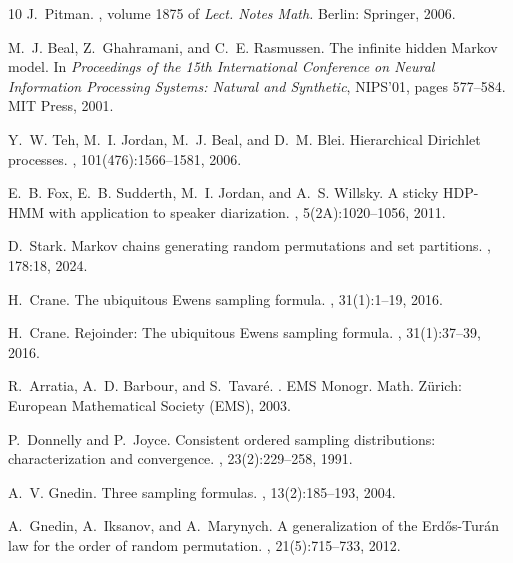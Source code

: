 \documentclass[11pt]{article}
\newcommand{\1}[1][]{
	\ifx&#1&\mathds{1}
	\else\mathds{1}\left\{#1\right\}\fi}
\theoremstyle{definition}
\theoremstyle{remark}
\numberwithin{equation}{section}
\begin{document}
	\begin{thebibliography}{10}
		J.~Pitman.
		, volume 1875 of {\em
			Lect. Notes Math.}
		\newblock Berlin: Springer, 2006.

		M.~J. Beal, Z.~Ghahramani, and C.~E. Rasmussen.
		\newblock The infinite hidden Markov model.
		\newblock In {\em Proceedings of the 15th International Conference on Neural
			Information Processing Systems: Natural and Synthetic}, NIPS'01, pages
		577--584. MIT Press, 2001.

		Y.~W. Teh, M.~I. Jordan, M.~J. Beal, and D.~M. Blei.
		\newblock Hierarchical {Dirichlet} processes.
		, 101(476):1566--1581, 2006.

		E.~B. Fox, E.~B. Sudderth, M.~I. Jordan, and A.~S. Willsky.
		\newblock A sticky {HDP}-{HMM} with application to speaker diarization.
		, 5(2A):1020--1056, 2011.

		D.~Stark.
		\newblock Markov chains generating random permutations and set partitions.
		, 178:18, 2024.

		H.~Crane.
		\newblock The ubiquitous {Ewens} sampling formula.
		, 31(1):1--19, 2016.

		H.~Crane.
		\newblock Rejoinder: {The} ubiquitous {Ewens} sampling formula.
		, 31(1):37--39, 2016.
		
		R.~Arratia, A.~D. Barbour, and S.~Tavar{\'e}.
		.
		\newblock EMS Monogr. Math. Z{\"u}rich: European Mathematical Society (EMS),
		2003.
		
		P.~Donnelly and P.~Joyce.
		\newblock Consistent ordered sampling distributions: characterization and
		convergence.
		, 23(2):229--258, 1991.

		A.~V. Gnedin.
		\newblock Three sampling formulas.
		, 13(2):185--193, 2004.

		A.~Gnedin, A.~Iksanov, and A.~Marynych.
		\newblock A generalization of the {E}rd{\H{o}}s-{T}ur\'{a}n law for the order
		of random permutation.
		, 21(5):715--733, 2012.


\end{thebibliography}
\end{document}
